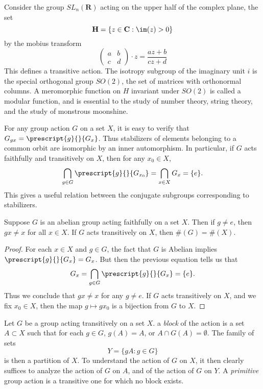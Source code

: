 \begin{example}
    Consider the group $SL_n(\mathbf{R})$ acting on the upper half of the complex plane, the set
    \[ \mathbf{H} = \{ z \in \mathbf{C} : \im(z) > 0 \} \]
    by the mobius transform
    \[\begin{pmatrix} a & b \\ c & d \end{pmatrix} \cdot z = \frac{az + b}{cz + d}\]
    This defines a transitive action. The isotropy subgroup of the imaginary unit $i$ is the special orthogonal group $SO(2)$, the set of matrices with orthonormal columns. A meromorphic function on $H$ invariant under $SO(2)$ is called a modular function, and is essential to the study of number theory, string theory, and the study of monstrous moonshine.
\end{example}

For any group action $G$ on a set $X$, it is easy to verify that $G_{gx} = \prescript{g}{}{G_x}$. Thus stabilizers of elements belonging to a common orbit are isomorphic by an inner automorphism. In particular, if $G$ acts faithfully and transitively on $X$, then for any $x_0 \in X$,
%
\[ \bigcap_{g \in G} \prescript{g}{}{G_{x_0}} = \bigcap_{x \in X} G_x = \{ e \}. \]
%
This gives a useful relation between the conjugate subgroups corresponding to stabilizers.

\begin{theorem}
    Suppose $G$ is an abelian group acting faithfully on a set $X$. Then if $g \neq e$, then $gx \neq x$ for all $x \in X$. If $G$ acts transitively on $X$, then $\#(G) = \#(X)$.
\end{theorem}
\begin{proof}
    For each $x \in X$ and $g \in G$, the fact that $G$ is Abelian implies $\prescript{g}{}{G_x} = G_x$. But then the previous equation tells us that
    \[ G_x = \bigcap_{g \in G} \prescript{g}{}{G_x} = \{ e \}. \]
    Thus we conclude that $gx \neq x$ for any $g \neq e$. If $G$ acts transitively on $X$, and we fix $x_0 \in X$, then the map $g \mapsto gx_0$ is a bijection from $G$ to $X$.
\end{proof}

Let $G$ be a group acting transitively on a set $X$. a \emph{block} of the action is a set $A \subset X$ such that for each $g \in G$, $g(A) = A$, or $A \cap G(A) = \emptyset$. The family of sets
%
\[ Y = \{ gA: g \in G \} \]
%
is then a partition of $X$. To understand the action of $G$ on $X$, it then clearly suffices to analyze the action of $G$ on $A$, and of the action of $G$ on $Y$. A \emph{primitive} group action is a transitive one for which no block exists.





